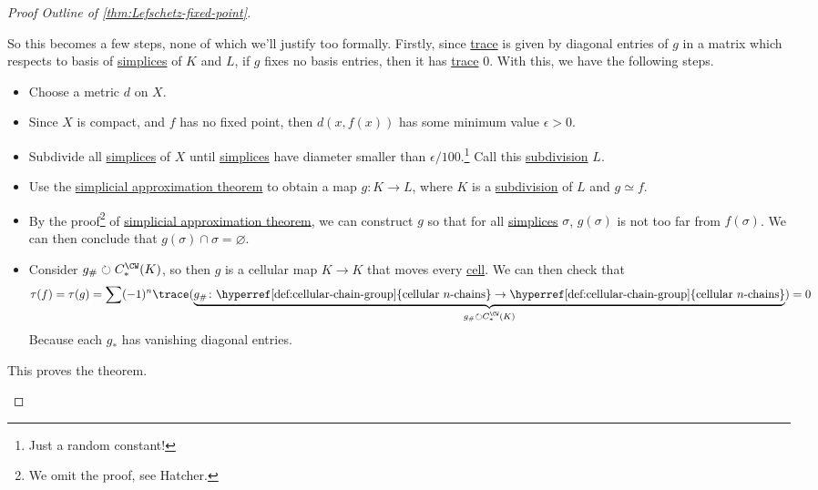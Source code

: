 \begin{proof}[Proof Outline of \autoref{thm:Lefschetz-fixed-point}]
\begin{enumerate}[(1)]
		      So this becomes a few steps, none of which we'll justify too formally. Firstly, since \hyperref[def:trace]{trace} is given by diagonal
		      entries of \(g\) in a matrix which respects to basis of \hyperref[def:standard-simplex]{simplices} of \(K\) and \(L\), if \(g\)
		      fixes no basis entries, then it has \hyperref[def:trace]{trace} \(0\). With this, we have the following steps.
		      \begin{itemize}
			      \item Choose a metric \(d\) on \(X\).
			      \item Since \(X\) is compact, and \(f\) has no fixed point, then \(d(x, f(x))\) has some minimum value \(\epsilon > 0\).
			      \item Subdivide all \hyperref[def:standard-simplex]{simplices} of \(X\) until \hyperref[def:standard-simplex]{simplices} have diameter
			            smaller than \(\epsilon /100\).\footnote{Just a random constant!} Call this \hyperref[eg:Barycentric-subdivision]{subdivision} \(L\).
			      \item Use the \hyperref[thm:simplicial-approximation-theorem]{simplicial approximation theorem} to obtain a map \(g \colon K \to L\),
			            where \(K\) is a \hyperref[eg:Barycentric-subdivision]{subdivision} of \(L\) and \(g \simeq f\).
			      \item By the proof\footnote{We omit the proof, see Hatcher\cite{hatcher2002algebraic}.} of \hyperref[thm:simplicial-approximation-theorem]{simplicial approximation theorem}, we can construct \(g\) so that for
			            all \hyperref[def:standard-simplex]{simplices} \(\sigma\), \(g(\sigma)\) is not too far from \(f(\sigma)\).
			            We can then conclude that \(g(\sigma) \cap \sigma = \varnothing \).
			      \item Consider \(g_\#\circlearrowright C^{\CW }_\ast (K)\), so then \(g\) is a cellular map \(K \to K\) that moves every \hyperref[def:cell]{cell}. We can then check that
			            \[
				            \tau(f) = \tau(g) = \sum (-1)^n \trace(\underbrace{g_\# \colon \text{\hyperref[def:cellular-chain-group]{cellular \(n\)-chains}} \to \text{\hyperref[def:cellular-chain-group]{cellular \(n\)-chains}}}_{g_\#\circlearrowright C^{\CW }_\ast (K)}) = 0
			            \]
			            Because each \(g_\ast\) has vanishing diagonal entries.
		      \end{itemize}
		      This proves the theorem.
	\end{enumerate}
\end{proof}

